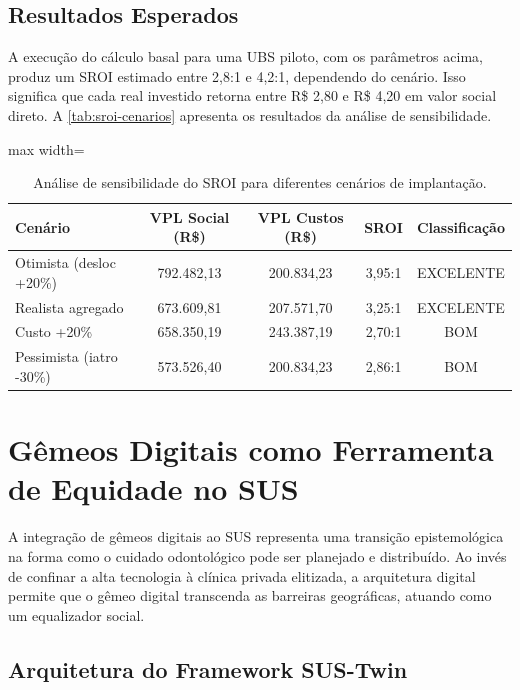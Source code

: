 \subsection{Resultados Esperados}

A execução do cálculo basal para uma UBS piloto, com os parâmetros
acima, produz um SROI estimado entre 2,8:1 e 4,2:1, dependendo do
cenário. Isso significa que cada real investido retorna entre R\$ 2,80
e R\$ 4,20 em valor social direto. A \autoref{tab:sroi-cenarios}
apresenta os resultados da análise de sensibilidade.

\begin{table}[htbp]
\centering
\caption{Análise de sensibilidade do SROI para diferentes cenários de implantação.}
\label{tab:sroi-cenarios}
\begin{adjustbox}{max width=\textwidth}
\begin{tabular}{lcccc}
\toprule
\textbf{Cenário} & \textbf{VPL Social (R\$)} & \textbf{VPL Custos (R\$)} &
\textbf{SROI} & \textbf{Classificação} \\
\midrule
Otimista (desloc +20\%) & 792.482,13 & 200.834,23 & 3,95:1 & EXCELENTE \\
Realista agregado       & 673.609,81 & 207.571,70 & 3,25:1 & EXCELENTE \\
Custo +20\%             & 658.350,19 & 243.387,19 & 2,70:1 & BOM \\
Pessimista (iatro -30\%)& 573.526,40 & 200.834,23 & 2,86:1 & BOM \\
\bottomrule
\end{tabular}
\end{adjustbox}
\end{table}

\section{Gêmeos Digitais como Ferramenta de Equidade no SUS}
\label{sec:equidade-sus}

A integração de gêmeos digitais ao SUS representa uma transição
epistemológica na forma como o cuidado odontológico pode ser planejado
e distribuído. Ao invés de confinar a alta tecnologia à clínica privada
elitizada, a arquitetura digital permite que o gêmeo digital transcenda
as barreiras geográficas, atuando como um equalizador social.

\subsection{Arquitetura do Framework SUS-Twin}

